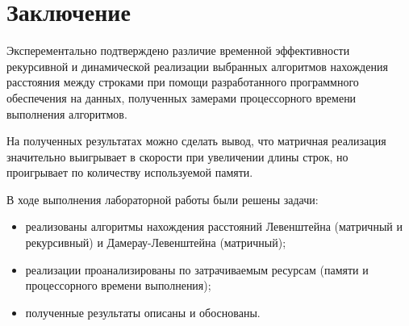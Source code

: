 \chapter*{Заключение}
Эксперементально подтверждено различие временной эффективности рекурсивной и динамической реализации выбранных алгоритмов нахождения расстояния между строками при помощи разработанного программного обеспечения на данных, полученных замерами процессорного времени выполнения алгоритмов.

На полученных результатах можно сделать вывод, что матричная реализация значительно выигрывает в скорости при увеличении длины строк, но проигрывает по количеству используемой памяти.

В ходе выполнения лабораторной работы были решены задачи:
\begin{itemize}
\item реализованы алгоритмы нахождения расстояний Левенштейна (матричный и рекурсивный) и Дамерау-Левенштейна (матричный);
\item реализации проанализированы по затрачиваемым ресурсам (памяти и процессорного времени выполнения);
\item полученные результаты описаны и обоснованы.
\end{itemize}

